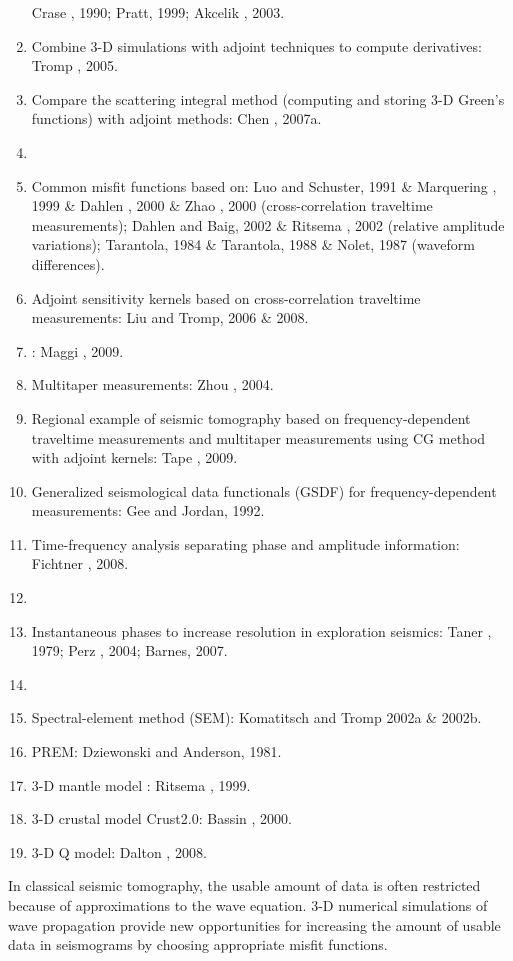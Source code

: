 \begin{enumerate}[\hspace{10mm}*]
    Crase \etal, 1990; Pratt, 1999; Akcelik \etal, 2003.
  \item Combine 3-D simulations with adjoint techniques to compute \Frechet derivatives:
    Tromp \etal, 2005.
  \item Compare the scattering integral method (computing and storing 3-D Green's functions)
    with adjoint methods: Chen \etal, 2007a.
  \item \sline
  \item Common misfit functions based on: Luo and Schuster, 1991 \& Marquering \etal, 1999 \&
    Dahlen \etal, 2000 \& Zhao \etal, 2000 (cross-correlation traveltime measurements);
    Dahlen and Baig, 2002 \& Ritsema \etal, 2002 (relative amplitude variations);
    Tarantola, 1984 \& Tarantola, 1988 \& Nolet, 1987 (waveform differences).
  \item Adjoint sensitivity kernels based on cross-correlation traveltime measurements:
    Liu and Tromp, 2006 \& 2008.
  \item {}: Maggi \etal, 2009.
  \item Multitaper measurements: Zhou \etal, 2004.
  \item Regional example of seismic tomography based on frequency-dependent traveltime measurements
    and multitaper measurements using CG method with adjoint kernels: Tape \etal, 2009.
  \item Generalized seismological data functionals (GSDF) for frequency-dependent measurements:
    Gee and Jordan, 1992.
  \item Time-frequency analysis separating phase and amplitude information: Fichtner \etal, 2008.
  \item \sline
  \item Instantaneous phases to increase resolution in exploration seismics:
    Taner \etal, 1979; Perz \etal, 2004; Barnes, 2007.
  \item \sline
  \item Spectral-element method (SEM): Komatitsch and Tromp 2002a \& 2002b.
  \item PREM: Dziewonski and Anderson, 1981.
  \item 3-D mantle model : Ritsema \etal, 1999.
  \item 3-D crustal model Crust2.0: Bassin \etal, 2000.
  \item 3-D Q model: Dalton \etal, 2008.
\end{enumerate}

 In classical seismic tomography, the usable amount of data is often restricted
because of approximations to the wave equation.
3-D numerical simulations of wave propagation provide new opportunities for increasing
the amount of usable data in seismograms by choosing appropriate misfit functions.

